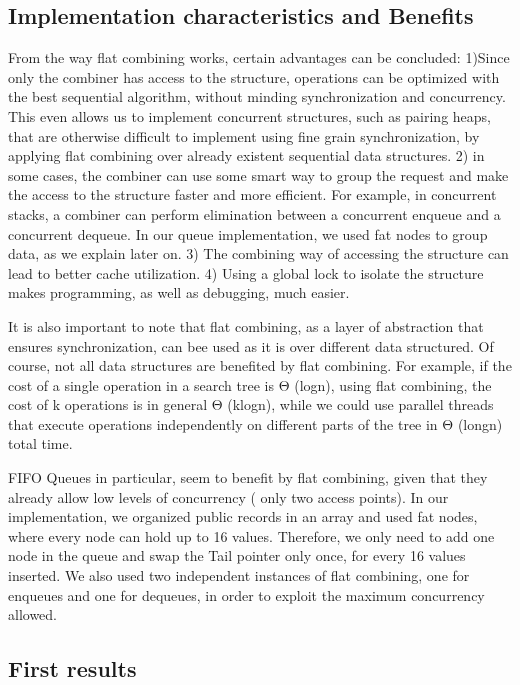\subsection{Implementation characteristics and Benefits}
From the way flat combining works, certain advantages can be concluded:
1)Since only the combiner has access to the structure, operations can be optimized with the best sequential algorithm, without minding synchronization and concurrency. This even allows us to implement concurrent structures, such as pairing heaps, that are otherwise difficult to implement using fine grain synchronization, by applying flat combining over already existent sequential data structures.
2) in some cases, the combiner can use some smart way to group the request and make the access to the structure faster and more efficient. For example, in concurrent stacks, a combiner can perform elimination between a concurrent enqueue and a concurrent dequeue. In our queue implementation, we used fat nodes to group data, as we explain later on.
3) The combining way of accessing the structure can lead to better cache utilization.
4) Using a global lock to isolate the structure makes programming, as well as debugging, much easier.

It is also important to note that flat combining, as a layer of abstraction that ensures synchronization, can bee used as it is over different data structured. Of course, not all data structures are benefited by flat combining. For example, if the cost of a single operation in a search tree is \textgreek{Θ} (logn), using flat combining, the cost of k operations is in general \textgreek{Θ} (klogn), while we could  use parallel threads that execute operations independently on different parts of the tree in \textgreek{Θ} (longn) total time.

FIFO Queues in particular, seem to benefit by flat combining, given that they already allow low levels of concurrency ( only two access points). In our implementation, we organized public records in an array and used fat nodes, where every node can hold up to 16 values. Therefore, we only need to add one node in the queue and swap the Tail pointer only once, for every 16 values inserted. We also used two independent instances of flat combining, one for enqueues and one for dequeues, in order to exploit the maximum concurrency allowed.

\subsection{First results}
 
